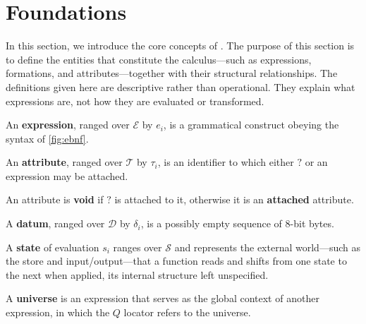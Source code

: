 
\section{Foundations}\label{sec:foundations}

In this section, we introduce the core concepts of \phic{}.
The purpose of this section is to define the entities
  that constitute the calculus---such as
  expressions, formations, and attributes---together
  with their structural relationships.
The definitions given here are descriptive rather than operational.
They explain what expressions are, not how they are evaluated or transformed.

\begin{definition}[Expression]
An \textbf{expression}, ranged over \(\mathcal{E}\) by \(e_i\),
  is a grammatical construct obeying the syntax of \cref{fig:ebnf}.
\end{definition}

\begin{definition}[Attribute]
An \textbf{attribute}, ranged over \(\mathcal{T}\) by \(\tau_i\),
  is an identifier to which either $?$ or an expression
  may be attached.
\end{definition}

\begin{definition}
An attribute is \textbf{void} if $?$ is attached to it,
  otherwise it is an \textbf{attached} attribute.
\end{definition}

\begin{definition}[Datum]
A \textbf{datum}, ranged over \(\mathcal{D}\) by \(\delta_i\),
  is a possibly empty sequence of 8-bit bytes.
\end{definition}

\begin{definition}[State]
A \textbf{state} of evaluation \(s_i\) ranges over \(\mathcal{S}\) and
  represents the external world---such as the store and
  input/output---that a function reads and shifts from one state to the
  next when applied, its internal structure left unspecified.
\end{definition}

\begin{definition}[Universe]
A \textbf{universe} is an expression that serves as the global context of
  another expression, in which the $Q$ locator refers to the universe.
\end{definition}

